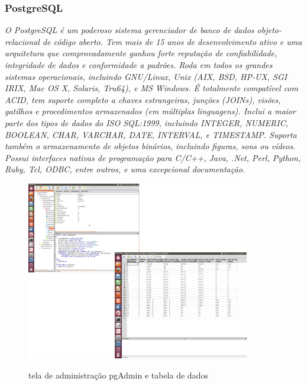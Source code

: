 \documentclass[a4paper,10pt]{article}
\begin{document}
	\subsubsection{PostgreSQL}
	{\it O PostgreSQL é um poderoso sistema gerenciador de banco de dados objeto-relacional de código aberto.  
	Tem mais de 15 anos de desenvolvimento ativo e uma arquitetura que comprovadamente ganhou forte reputação 
	de confiabilidade, integridade de dados e conformidade a padrões.  Roda em todos os grandes sistemas operacionais, 
	incluindo GNU/Linux, Unix (AIX, BSD, HP-UX, SGI IRIX, Mac OS X, Solaris, Tru64), e MS Windows. É totalmente compatível
	 com ACID, tem suporte completo a chaves estrangeiras, junções (JOINs), visões, gatilhos e procedimentos armazenados
	 (em múltiplas linguagens).  Inclui a maior parte dos tipos de dados do ISO SQL:1999, incluindo INTEGER, NUMERIC, BOOLEAN, 
	CHAR, VARCHAR, DATE, INTERVAL, e TIMESTAMP.  Suporta também o armazenamento de objetos binários, incluindo figuras, sons ou
	 vídeos.  Possui interfaces nativas de programação para C/C++, Java, .Net, Perl, Python, Ruby, Tcl, ODBC, entre outros, e 
	uma excepcional documentação.}


	\begin{figure}[H]
	\centering
	\includegraphics[width=0.87\textwidth]{./imgs/pgAdminLibrary.png}\\[1cm]   
	\caption{tela de administração pgAdmin e tabela de dados}
	\label{telaPgAdmin}
      	\end{figure}
		
\end{document}
